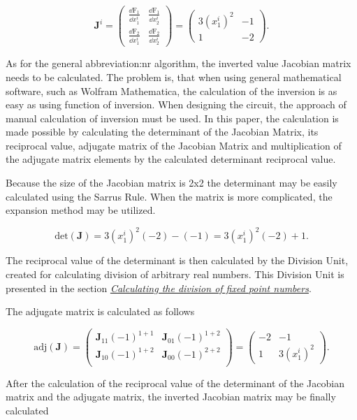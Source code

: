 \documentclass[a4paper, twoside, 11pt]{article}
\begin{document}
    \begin{equation}
        \textbf{J}^i = 
        \begin{pmatrix}
            \frac{\dd \text{F}_1}{\dd x_1^i} & \frac{\dd \text{F}_1}{\dd x_2^i}\\
            \frac{\dd \text{F}_2}{\dd x_1^i} & \frac{\dd \text{F}_2}{\dd x_2^i}
        \end{pmatrix}
        =
        \begin{pmatrix}
            3 (x_1^i)^2 & -1\\
            1 & -2
        \end{pmatrix}.
    \end{equation}

    As for the general \gls{abbreviation:nr} algorithm, the inverted value Jacobian matrix needs to be calculated. The problem is, that when using general mathematical software, such as Wolfram Mathematica, the calculation of the inversion is as easy as using function of inversion. When designing the circuit, the approach of manual calculation of inversion must be used. In this paper, the calculation is made possible by calculating the determinant of the Jacobian Matrix, its reciprocal value, adjugate matrix of the Jacobian Matrix and multiplication of the adjugate matrix elements by the calculated determinant reciprocal value.\par
    Because the size of the Jacobian matrix is 2x2 the determinant may be easily calculated using the Sarrus Rule. When the matrix is more complicated, the expansion method may be utilized.

    \begin{equation}
        \text{det}(\textbf{J}) = 3 (x_1^i)^2 (-2) - (-1) = 3 (x_1^i)^2 (-2) + 1.
    \end{equation}

    The reciprocal value of the determinant is then calculated by the Division Unit, created for calculating division of arbitrary real numbers. This Division Unit is presented in the section \hyperref[sec:calculating-the-division-of-fixed-point-numbers]{\textit{Calculating the division of fixed point numbers}}.\par
The adjugate matrix is calculated as follows

    \begin{equation}
        \text{adj}(\textbf{J}) =
        \begin{pmatrix}
            \textbf{J}_{11} (-1)^{1+1} & \textbf{J}_{01} (-1)^{1+2}\\

            \textbf{J}_{10} (-1)^{1+2} & \textbf{J}_{00} (-1)^{2+2}\\
        \end{pmatrix} =
        \begin{pmatrix}
            -2 & -1\\
            1 & 3 (x_1^i)^2
        \end{pmatrix}.
    \end{equation}
\par
    After the calculation of the reciprocal value of the determinant of the Jacobian matrix and the adjugate matrix, the inverted Jacobian matrix may be finally calculated
\end{document}
